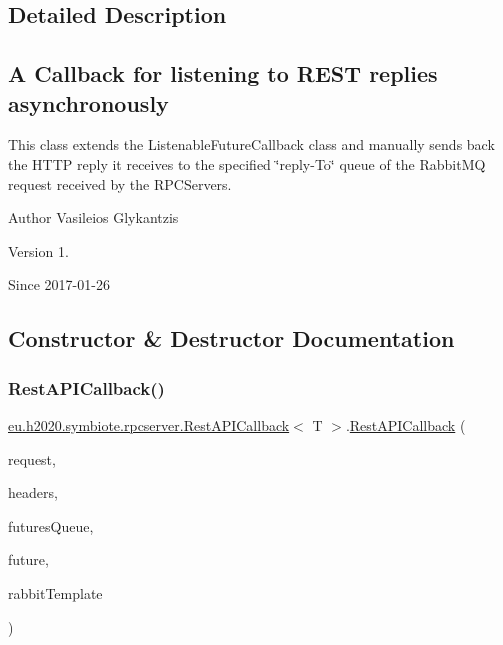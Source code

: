 \subsection{Detailed Description}
\subsection*{A Callback for listening to R\+E\+ST replies asynchronously}

This class extends the Listenable\+Future\+Callback class and manually sends back the H\+T\+TP reply it receives to the specified \char`\"{}reply-\/\+To\char`\"{} queue of the Rabbit\+MQ request received by the R\+P\+C\+Servers.

\begin{DoxyAuthor}{Author}
Vasileios Glykantzis 
\end{DoxyAuthor}
\begin{DoxyVersion}{Version}
1. 
\end{DoxyVersion}
\begin{DoxySince}{Since}
2017-\/01-\/26 
\end{DoxySince}


\subsection{Constructor \& Destructor Documentation}
\mbox{\label{classeu_1_1h2020_1_1symbiote_1_1rpcserver_1_1RestAPICallback_ad5c5d0f8a589e0555039a1742642789a}} 
\subsubsection{\texorpdfstring{Rest\+A\+P\+I\+Callback()}{RestAPICallback()}}
{\footnotesize\ttfamily \hyperlink{classeu_1_1h2020_1_1symbiote_1_1rpcserver_1_1RestAPICallback}{eu.\+h2020.\+symbiote.\+rpcserver.\+Rest\+A\+P\+I\+Callback}$<$ T $>$.\hyperlink{classeu_1_1h2020_1_1symbiote_1_1rpcserver_1_1RestAPICallback}{Rest\+A\+P\+I\+Callback} (\begin{DoxyParamCaption}\item[{String}]{request,  }\item[{Map$<$ String, String $>$}]{headers,  }\item[{Queue$<$ Listenable\+Future$<$ Response\+Entity$<$ J\+S\+O\+N\+Object $>$$>$$>$}]{futures\+Queue,  }\item[{Listenable\+Future$<$ Response\+Entity$<$ J\+S\+O\+N\+Object $>$$>$}]{future,  }\item[{Rabbit\+Template}]{rabbit\+Template }\end{DoxyParamCaption})}

